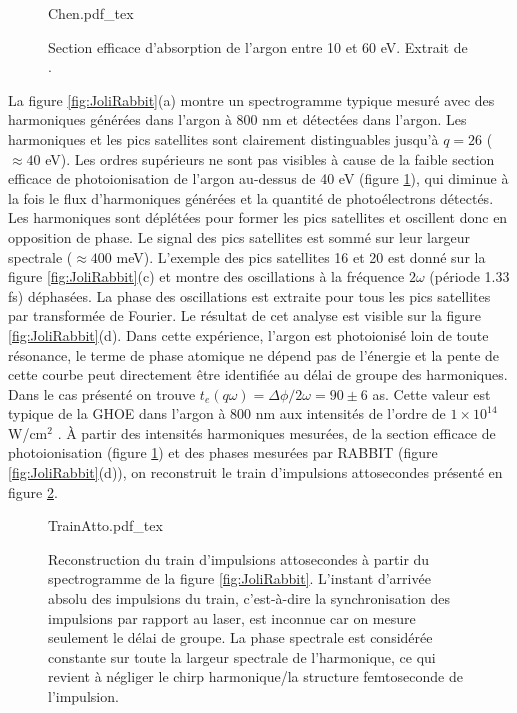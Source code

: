 \begin{figure}
\centering
\def\svgwidth{0.6\columnwidth}
{Chen.pdf_tex}
\caption{Section efficace d'absorption de l'argon entre 10 et 60 eV. Extrait de .}
\label{fig:ChenAr}
\end{figure}

La figure \ref{fig:JoliRabbit}(a) montre un spectrogramme typique mesuré avec des harmoniques générées dans l'argon à 800 nm et détectées dans l'argon. Les harmoniques et les pics satellites sont clairement distinguables jusqu'à $q = 26$ ($\approx 40$ eV). Les ordres supérieurs ne sont pas visibles à cause de la faible section efficace de photoionisation de l'argon au-dessus de 40 eV (figure \ref{fig:ChenAr}), qui diminue à la fois le flux d'harmoniques générées et la quantité de photoélectrons détectés. Les harmoniques sont déplétées pour former les pics satellites et oscillent donc en opposition de phase. Le signal des pics satellites est sommé sur leur largeur spectrale ($\approx 400$ meV). L'exemple des pics satellites 16 et 20 est donné sur la figure \ref{fig:JoliRabbit}(c) et montre des oscillations à la fréquence $2 \omega$ (période 1.33 fs) déphasées. La phase des oscillations est extraite pour tous les pics satellites par transformée de Fourier. Le résultat de cet analyse est visible sur la figure \ref{fig:JoliRabbit}(d). Dans cette expérience, l'argon est photoionisé loin de toute résonance, le terme de phase atomique ne dépend pas de l'énergie et la pente de cette courbe peut directement être identifiée au délai de groupe des harmoniques. Dans le cas présenté on trouve $t_e (q\omega) = \Delta \phi / 2\omega = 90 \pm 6$ as. Cette valeur est typique de la GHOE dans l'argon à 800 nm aux intensités de l'ordre de $1 \times 10^{14}$ W/cm$^2$ . \`{A} partir des intensités harmoniques mesurées, de la section efficace de photoionisation (figure \ref{fig:ChenAr}) et des phases mesurées par RABBIT (figure \ref{fig:JoliRabbit}(d)), on reconstruit le train d'impulsions attosecondes présenté en figure \ref{fig:TrainAtto}.

\begin{figure}
\centering
\def\svgwidth{0.5\columnwidth}
{TrainAtto.pdf_tex}
\caption{Reconstruction du train d'impulsions attosecondes à partir du spectrogramme de la figure \ref{fig:JoliRabbit}. L'instant d'arrivée absolu des impulsions du train, c'est-à-dire la synchronisation des impulsions par rapport au laser, est inconnue car on mesure seulement le délai de groupe. La phase spectrale est considérée constante sur toute la largeur spectrale de l'harmonique, ce qui revient à négliger le chirp harmonique/la structure femtoseconde de l'impulsion.}
\label{fig:TrainAtto}
\end{figure}

